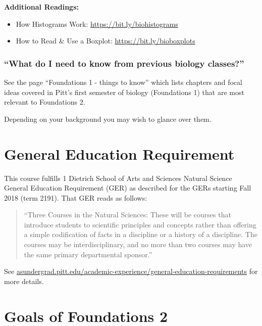 \documentclass[
]{book}
\providecommand{\tightlist}{%
  \setlength{\itemsep}{0pt}\setlength{\parskip}{0pt}}
\begin{document}
\textbf{Additional Readings:}

\begin{itemize}
\tightlist
\item
  How Histograms Work: \url{https://bit.ly/biohistograms}
\item
  How to Read \& Use a Boxplot: \url{https://bit.ly/bioboxplots}
\end{itemize}

\hypertarget{what-do-i-need-to-know-from-previous-biology-classes}{%
\subsection{``What do I need to know from previous biology classes?''}\label{what-do-i-need-to-know-from-previous-biology-classes}}

See the page ``Foundations 1 - things to know'' which lists chapters and focal ideas covered in Pitt's first semester of biology (Foundations 1) that are most relevant to Foundations 2.

Depending on your background you may wish to glance over them.

\hypertarget{general-education-requirement}{%
\chapter{General Education Requirement}\label{general-education-requirement}}

This course fulfills 1 Dietrich School of Arts and Sciences Natural Science General Education Requirement (GER) as described for the GERs starting Fall 2018 (term 2191). That GER reads as follows:

\begin{quote}
``Three Courses in the Natural Sciences: These will be courses that introduce students to scientific principles and concepts rather than offering a simple codification of facts in a discipline or a history of a discipline. The courses may be interdisciplinary, and no more than two courses may have the same primary departmental sponsor.''
\end{quote}

See \href{https://asundergrad.pitt.edu/academic-experience/general-education-requirements}{asundergrad.pitt.edu/academic-experience/general-education-requirements} for more details.

\hypertarget{goals-of-foundations-2}{%
\chapter{Goals of Foundations 2}\label{goals-of-foundations-2}}
\end{document}
